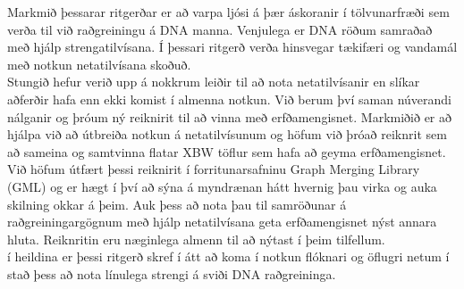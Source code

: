 \documentclass[a4paper,12pt,twoside,BCOR=10mm]{scrbook}
\begin{document}
Markmið þessarar ritgerðar er að varpa ljósi á þær áskoranir í tölvunarfræði sem verða til við raðgreiningu á DNA manna. Venjulega er DNA röðum samraðað með hjálp strengatilvísana. Í þessari ritgerð verða hinsvegar tækifæri og vandamál með notkun netatilvísana skoðuð. \\
Stungið hefur verið upp á nokkrum leiðir til að nota netatilvísanir en slíkar aðferðir hafa enn ekki komist í almenna notkun. Við berum því saman núverandi nálganir og þróum ný reiknirit til að vinna með erfðamengisnet.
Markmiðið er að hjálpa við að útbreiða notkun á netatilvísunum og höfum við þróað reiknrit sem að sameina og samtvinna flatar XBW töflur sem hafa að geyma erfðamengisnet. Við höfum útfært þessi reiknirit í forritunarsafninu Graph Merging Library (GML) og er hægt í því að sýna á myndrænan hátt hvernig þau virka og auka skilning okkar á þeim. Auk þess að nota þau til samröðunar á raðgreiningargögnum með hjálp netatilvísana geta erfðamengisnet nýst annara hluta. Reiknritin eru næginlega almenn til að nýtast í þeim tilfellum. \\
í heildina er þessi ritgerð skref í átt að koma í notkun flóknari og öflugri netum í stað þess að nota línulega strengi á sviði DNA raðgreininga.

\end{document}
